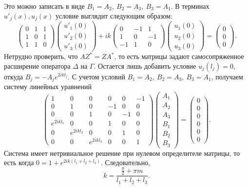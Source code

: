Это можно записать в виде $B_1=A_2, \ B_2 = A_3, \ B_3 = A_1.$ В терминах $u'_j(x),u_j(x)$ условие выглядит следующим образом:
\begin{equation}
\begin{pmatrix}
0	&	1	&	1	\\
1	&	0	&	1	\\
1	&	1	&	0	
\end{pmatrix}
\begin{pmatrix}
u'_1(0)	\\	
u'_2(0)	\\	
u'_3(0)
\end{pmatrix}
+ i k
\begin{pmatrix}
0	&	-1	&	1	\\
1	&	0	&	-1	\\
-1	&	1	&	0	
\end{pmatrix}
\begin{pmatrix}
u_1(0)	\\	
u_2(0)	\\	
u_3(0)
\end{pmatrix}
=
\begin{pmatrix}
0	\\
0	\\
0
\end{pmatrix}.
\label{eq:quantumBookCondition1D}
\end{equation}
Нетрудно проверить, что $A Z^* = Z A^*$, то есть матрицы задают самосопряженное расширение оператора $\Delta$ на $\Gamma$.
Остается лишь добавить условие $u_j(l_j)=0$, откуда $B_j = - A_j e^{2 i k l_j}$. С учетом условий $B_1=A_2, \ B_2 = A_3, \ B_3 = A_1$, получаем систему линейных уравнений 
\begin{equation}
\begin{pmatrix}
1			&	0			&	0		&	0	&	0	&	-1	\\
0			&	1			&	0		&	-1	&	0	&	0	\\
0			&	0			&	1		&	0	&	-1	&	0	\\
e^{2 i k l_1}	&	0			&	0		&	1	&	0	&	0	\\
0			&	e^{2 i k l_2}	&	0		&	0	&	1	&	0	\\
0			&	0			&e^{2 i k l_3}	&	0	&	0	&	1
\end{pmatrix}
\begin{pmatrix}
A_1 \\ A_2 \\ A_3 \\ B_1 \\ B_2 \\ B_3
\end{pmatrix}=
\begin{pmatrix}
0	\\	0	\\	0	\\	0	\\	0	\\	0
\end{pmatrix}.
\label{eq:6by6matrix}
\end{equation}
Система имеет нетривиальное решение при нулевом определителе матрицы, то есть когда 
$0=1 + e^{2 i k (l_1+l_2+l_3)}$. Следовательно,
$$ k = \frac{\frac{\pi}{2} + \pi m}{l_1+l_2+l_3}.$$

